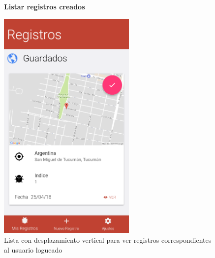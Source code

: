 				\begin{figure}
					\hspace*{1cm}\raggedright\large\textbf{Listar registros creados}\par\medskip
					\centering
						\includegraphics[width=0.6\textwidth]{Screenshots/registrosLocales.png}
						\caption{Lista con desplazamiento vertical para ver registros correspondientes al usuario logueado}
				\end{figure}



